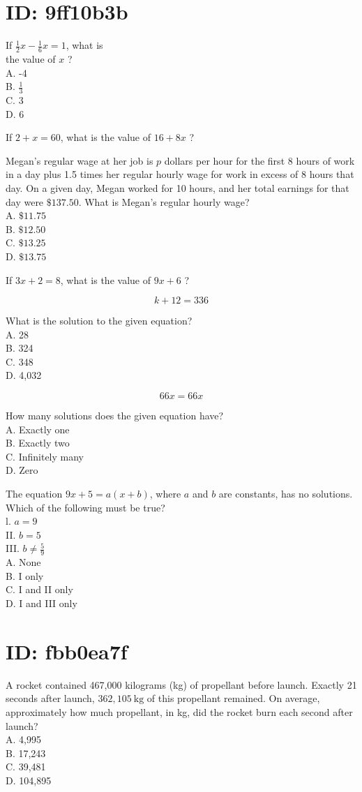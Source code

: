 \section*{ID: 9ff10b3b}
If $\frac{1}{2} x-\frac{1}{6} x=1$, what is\\
the value of $x$ ?\\
A. -4\\
B. $\frac{1}{3}$\\
C. 3\\
D. 6

If $2+x=60$, what is the value of $16+8 x$ ?

Megan's regular wage at her job is $p$ dollars per hour for the first 8 hours of work in a day plus 1.5 times her regular hourly wage for work in excess of 8 hours that day. On a given day, Megan worked for 10 hours, and her total earnings for that day were $\$ 137.50$. What is Megan's regular hourly wage?\\
A. $\$ 11.75$\\
B. $\$ 12.50$\\
C. $\$ 13.25$\\
D. $\$ 13.75$

If $3 x+2=8$, what is the value of $9 x+6$ ?

$$
k+12=336
$$

What is the solution to the given equation?\\
A. 28\\
B. 324\\
C. 348\\
D. 4,032

$$
66 x=66 x
$$

How many solutions does the given equation have?\\
A. Exactly one\\
B. Exactly two\\
C. Infinitely many\\
D. Zero

The equation $9 x+5=a(x+b)$, where $a$ and $b$ are constants, has no solutions. Which of the following must be true?\\
l. $a=9$\\
II. $b=5$\\
III. $b \neq \frac{5}{9}$\\
A. None\\
B. I only\\
C. I and II only\\
D. I and III only

\section*{ID: fbb0ea7f}
A rocket contained 467,000 kilograms (kg) of propellant before launch. Exactly 21 seconds after launch, $362,105 \mathrm{~kg}$ of this propellant remained. On average, approximately how much propellant, in kg, did the rocket burn each second after launch?\\
A. 4,995\\
B. 17,243\\
C. 39,481\\
D. 104,895

